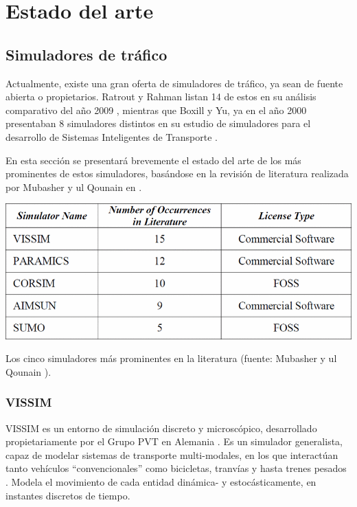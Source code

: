 \section{Estado del arte}\label{sec:state_of_the_art}

\subsection{Simuladores de tráfico}

Actualmente, existe una gran oferta de simuladores de tráfico, ya sean de fuente abierta o propietarios. Ratrout y Rahman listan 14 de estos en su análisis comparativo del año 2009 \autocite{ratrout2009comparative}, mientras que Boxill y Yu, ya en el año 2000 presentaban 8 simuladores distintos en su estudio de simuladores para el desarrollo de Sistemas Inteligentes de Transporte \autocite{boxill2000evaluation}.

En esta sección se presentará brevemente el estado del arte de los más prominentes de estos simuladores, basándose en la revisión de literatura realizada por Mubasher y ul Qounain en \autocite{traffic_sim_review}.

\begin{table}
    \centering
    \includegraphics[width=\linewidth]{figuras/popular_trafficsims}
    \caption[Tabla comparativa simuladores de tráfico.]{Los cinco simuladores más prominentes en la literatura (fuente: Mubasher y ul Qounain \autocite{traffic_sim_review}).}
    \label{table:prom_trafficsim}
\end{table}

\subsubsection{VISSIM}

VISSIM es un entorno de simulación discreto y microscópico, desarrollado propietariamente por el Grupo PVT en Alemania \autocite{vissim}. Es un simulador generalista, capaz de modelar sistemas de transporte multi-modales, en los que interactúan tanto vehículos ``convencionales'' como bicicletas, tranvías y hasta trenes pesados \autocite{fellendorf2010microscopic}. Modela el movimiento de cada entidad dinámica- y estocásticamente, en instantes discretos de tiempo. 

